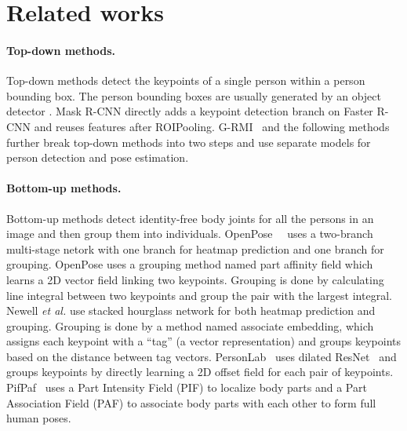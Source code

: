 \documentclass[10pt,twocolumn,letterpaper]{article}
\begin{document}
\section{Related works}
\paragraph{Top-down methods.} Top-down methods \cite{xiao2018simple,sun2019deep,WangSCJDZLMTWLX19,papandreou2017towards,he2017mask,huang2017coarse,fang2017rmpe,chen2018cascaded,newell2016stacked} detect the keypoints of a single person within a person bounding box. The person bounding boxes are usually generated by an object detector \cite{ren2015faster,lin2017feature,cheng2018revisiting,cheng2018decoupled}. Mask R-CNN \cite{he2017mask} directly adds a keypoint detection branch on Faster R-CNN \cite{ren2015faster} and reuses features after ROIPooling. G-RMI~\cite{papandreou2017towards} and the following methods further break top-down methods into two steps and use separate models for person detection and pose estimation.
\vspace{-2mm}
\paragraph{Bottom-up methods.} Bottom-up methods \cite{pishchulin2016deepcut,insafutdinov2016deepercut,iqbal2016multi,cao2017realtime,newwell2017associative} detect identity-free body joints for all the persons in an image and then group them into individuals. OpenPose~\
\cite{cao2017realtime} uses a two-branch multi-stage netork with one branch for heatmap prediction and one branch for grouping. OpenPose uses a grouping method named part affinity field which learns a 2D vector field linking two keypoints. Grouping is done by calculating line integral between two keypoints and group the pair with the largest integral. Newell \emph{et al.} \cite{newwell2017associative} use stacked hourglass network \cite{newell2016stacked} for both heatmap prediction and grouping. Grouping is done by a method named associate embedding, which assigns each keypoint with a ``tag'' (a vector representation) and groups keypoints based on the  distance between tag vectors. PersonLab~\cite{papandreou2018personlab} uses dilated ResNet~\cite{he2016deep} and groups keypoints by directly learning a 2D offset field for each pair of keypoints. PifPaf~\cite{kreiss2019pifpaf} uses a Part Intensity Field (PIF) to localize body parts and a Part Association Field (PAF) to associate body parts with each other to form full human poses.
\end{document}
